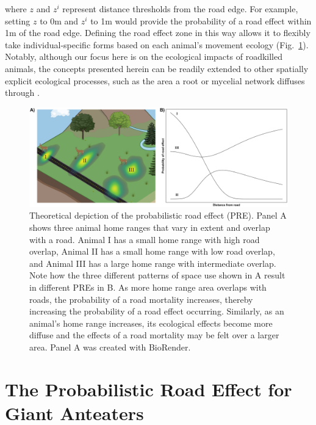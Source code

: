 \documentclass[11pt]{article}
\begin{document}
where $z$ and $z^i$ represent distance thresholds from the road edge. For example, setting $z$ to 0m and $z^i$ to 1m would provide the probability of a road effect within 1m of the road edge. Defining the road effect zone in this way allows it to flexibly take individual-specific forms based on each animal's movement ecology (Fig.~\ref{Fig:PRE}). Notably, although our focus here is on the ecological impacts of roadkilled animals, the concepts presented herein can be readily extended to other spatially explicit ecological processes, such as the area a root or mycelial network diffuses through \citep{Bielvcik:2019}.


\begin{figure}[h!]
\centering
\includegraphics[scale = 0.9]{Theory_Fig}
\caption{Theoretical depiction of the probabilistic road effect (PRE). Panel A shows three animal home ranges that vary in extent and overlap with a road. Animal I has a small home range with high road overlap, Animal II has a small home range with low road overlap, and Animal III has a large home range with intermediate overlap. Note how the three different patterns of space use shown in A result in different PREs in B. As more home range area overlaps with roads, the probability of a road mortality increases, thereby increasing the probability of a road effect occurring. Similarly, as an animal’s home range increases, its ecological effects become more diffuse and the effects of a road mortality may be felt over a larger area. Panel A was created with BioRender.}
\label{Fig:PRE}
\end{figure}



\section*{The Probabilistic Road Effect for Giant Anteaters}
\end{document}

